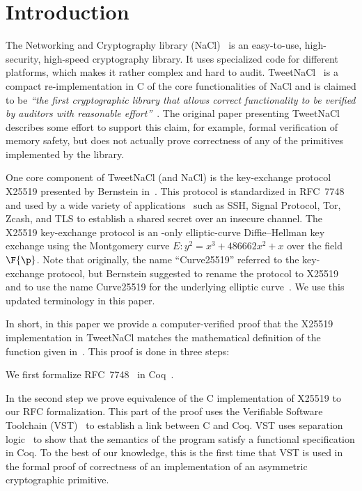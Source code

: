 \section{Introduction}
\label{sec:intro}

The Networking and Cryptography library (NaCl)~\cite{BLS12}
is an easy-to-use, high-security, high-speed cryptography library.
It uses specialized code for different platforms, which makes it rather complex and hard to audit.
TweetNaCl~\cite{BGJ+15} is a compact re-implementation in C
of the core functionalities of NaCl and is claimed to be
\emph{``the first cryptographic library that allows correct functionality
  to be verified by auditors with reasonable effort''}~\cite{BGJ+15}.
The original paper presenting TweetNaCl describes some effort to support
this claim, for example, formal verification of memory safety, but does not actually
prove correctness of any of the primitives implemented by the library.

One core component of TweetNaCl (and NaCl) is the key-exchange protocol X25519 presented
by Bernstein in~\cite{Ber06}.
This protocol is standardized in RFC~7748 and used by a wide variety of applications~\cite{things-that-use-curve25519}
such as SSH, Signal Protocol, Tor, Zcash, and TLS to establish a shared secret over
an insecure channel.
The X25519 key-exchange protocol is an \xcoord-only
elliptic-curve Diffie--Hellman key exchange using the Montgomery
curve $E: y^2 = x^3 + 486662 x^2 + x$ over the field $\F{\p}$.
Note that originally, the name ``Curve25519'' referred to the key-exchange protocol,
but Bernstein suggested to rename the protocol to X25519 and to use the name
Curve25519 for the underlying elliptic curve~\cite{Ber14}.
We use this updated terminology in this paper.

In short, in this paper we provide a computer-verified proof that the
X25519 implementation in TweetNaCl matches the mathematical definition
of the function given in~\cite[Sec.~2]{Ber06}.
This proof is done in three steps:

We first formalize RFC~7748~\cite{rfc7748} in Coq~\cite{coq-faq}.

In the second step we prove equivalence of the C implementation of X25519
to our RFC formalization.
This part of the proof uses the Verifiable Software Toolchain (VST)~\cite{2012-Appel}
to establish a link between C and Coq.
VST uses separation logic~\cite{1969-Hoare,Reynolds02separationlogic}
to show that the semantics of the program satisfy a functional specification in Coq.
To the best of our knowledge, this is the first time that VST
is used in the formal proof of correctness of an implementation
of an asymmetric cryptographic primitive.

